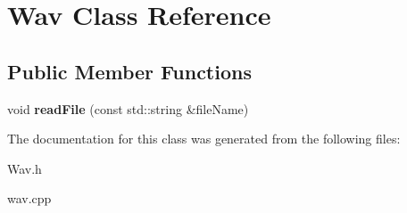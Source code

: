 \hypertarget{classWav}{}\section{Wav Class Reference}
\label{classWav}
\subsection*{Public Member Functions}
\begin{DoxyCompactItemize}
\item 
\mbox{\label{classWav_a1c4230cec49d30147a5b8a1950083f7c}} 
void {\bfseries read\+File} (const std\+::string \&file\+Name)
\end{DoxyCompactItemize}


The documentation for this class was generated from the following files\+:\begin{DoxyCompactItemize}
\item 
Wav.\+h\item 
wav.\+cpp\end{DoxyCompactItemize}
